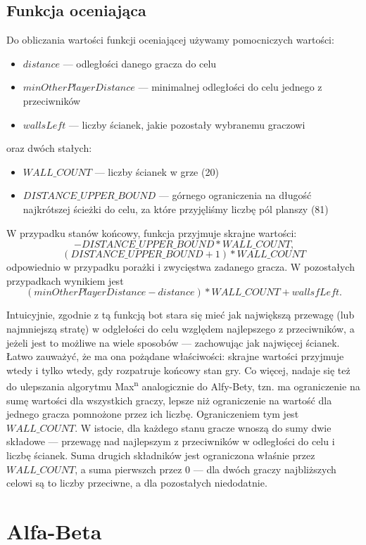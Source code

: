 \documentclass{pracamgr}
\begin{document}
\subsection{Funkcja oceniająca}

Do obliczania wartości funkcji oceniającej używamy pomocniczych wartości:
\begin{itemize}
\item \(distance\) --- odległości danego gracza do celu
\item \(minOtherPlayerDistance\) --- minimalnej odległości do celu jednego z przeciwników
\item \(wallsLeft\) --- liczby ścianek, jakie pozostały wybranemu graczowi
\end{itemize}
oraz dwóch stałych:
\begin{itemize}
\item \(WALL\_COUNT\) --- liczby ścianek w grze (20)
\item \(DISTANCE\_UPPER\_BOUND\) --- górnego ograniczenia na długość najkrótszej ścieżki do celu, za które przyjęliśmy liczbę pól planszy (81)
\end{itemize}
W przypadku stanów końcowy, funkcja przyjmuje skrajne wartości: \[-DISTANCE\_UPPER\_BOUND * WALL\_COUNT \text{,}\] \[(DISTANCE\_UPPER\_BOUND + 1) * WALL\_COUNT\] odpowiednio w przypadku porażki i zwycięstwa zadanego gracza.
W pozostałych przypadkach wynikiem jest \[(minOtherPlayerDistance - distance) * WALL\_COUNT + wallsfLeft \text{.}\]

Intuicyjnie, zgodnie z tą funkcją bot stara się mieć jak największą przewagę (lub najmniejszą stratę) w odglełości do celu względem najlepszego z przeciwników, a jeżeli jest to możliwe na wiele sposobów --- zachowując jak najwięcej ścianek.
Łatwo zauważyć, że ma ona pożądane właściwości: skrajne wartości przyjmuje wtedy i tylko wtedy, gdy rozpatruje końcowy stan gry.
Co więcej, nadaje się też do ulepszania algorytmu Max\textsuperscript{n} analogicznie do Alfy-Bety, tzn. ma ograniczenie na sumę wartości dla wszystkich graczy, lepsze niż ograniczenie na wartość dla jednego gracza pomnożone przez ich liczbę.
Ograniczeniem tym jest \(WALL\_COUNT\).
W istocie, dla każdego stanu gracze wnoszą do sumy dwie składowe --- przewagę nad najlepszym z przeciwników w odległości do celu i liczbę ścianek.
Suma drugich składników jest ograniczona właśnie przez \(WALL\_COUNT\), a suma pierwszch przez \(0\) --- dla dwóch graczy najbliższych celowi są to liczby przeciwne, a dla pozostałych niedodatnie.

\section {Alfa-Beta}
\end{document}

